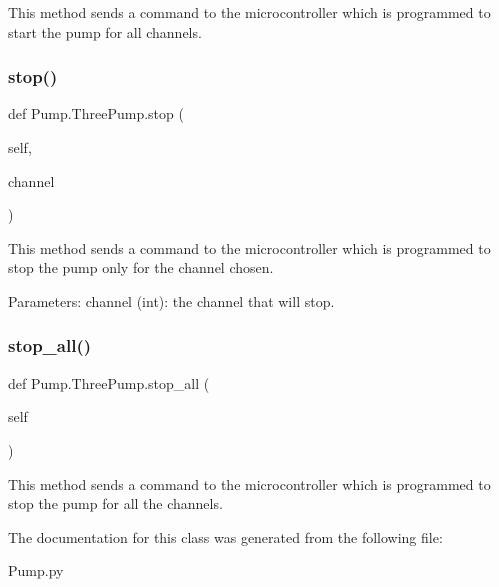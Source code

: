 \begin{DoxyVerb}This method sends a command to the microcontroller which is programmed to start the pump for all channels.
\end{DoxyVerb}
 \mbox{\label{class_pump_1_1_three_pump_afa6004e95a824a9ce1cc082a821d75a2}} 
\subsubsection{\texorpdfstring{stop()}{stop()}}
{\footnotesize\ttfamily def Pump.\+Three\+Pump.\+stop (\begin{DoxyParamCaption}\item[{}]{self,  }\item[{}]{channel }\end{DoxyParamCaption})}

\begin{DoxyVerb}This method sends a command to the microcontroller which is programmed to stop the pump only for the channel chosen.

Parameters:
    channel (int): the channel that will stop.
\end{DoxyVerb}
 \mbox{\label{class_pump_1_1_three_pump_ad03f8166958397980225c3051c9ce9b3}} 
\subsubsection{\texorpdfstring{stop\_all()}{stop\_all()}}
{\footnotesize\ttfamily def Pump.\+Three\+Pump.\+stop\+\_\+all (\begin{DoxyParamCaption}\item[{}]{self }\end{DoxyParamCaption})}

\begin{DoxyVerb}This method sends a command to the microcontroller which is programmed to stop the pump for all the channels.
\end{DoxyVerb}
 

The documentation for this class was generated from the following file\+:\begin{DoxyCompactItemize}
\item 
Pump.\+py\end{DoxyCompactItemize}
